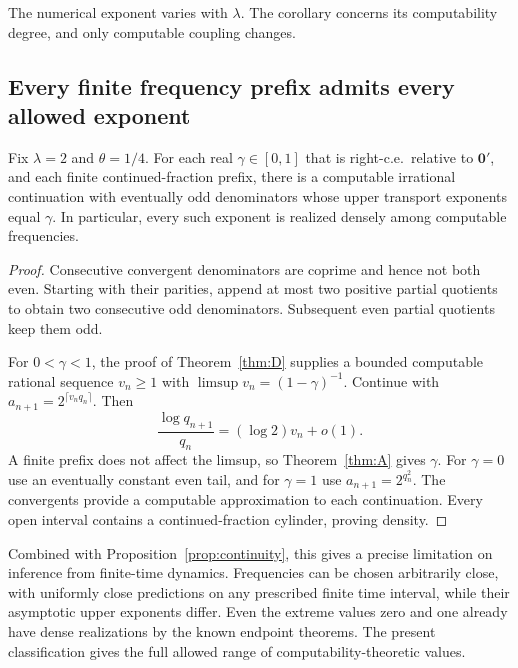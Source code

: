 The numerical exponent varies with $\lambda$. The corollary concerns its computability degree, and only computable coupling changes.

\subsection{Every finite frequency prefix admits every allowed exponent}

\begin{corollary}\label{cor:dense}
Fix $\lambda=2$ and $\theta=1/4$.
For each real $\gamma\in[0,1]$ that is right-c.e.\ relative to $\mathbf0'$, and each finite continued-fraction prefix, there is a computable irrational continuation with eventually odd denominators whose upper transport exponents equal $\gamma$.
In particular, every such exponent is realized densely among computable frequencies.
\end{corollary}
\begin{proof}
Consecutive convergent denominators are coprime and hence not both even.
Starting with their parities, append at most two positive partial quotients to obtain two consecutive odd denominators. Subsequent even partial quotients keep them odd.

For $0<\gamma<1$, the proof of Theorem~\ref{thm:D} supplies a bounded computable rational sequence $v_n\ge1$ with
$\limsup v_n=(1-\gamma)^{-1}$.
Continue with $a_{n+1}=2^{\lceil v_nq_n\rceil}$.
Then
\[
\frac{\log q_{n+1}}{q_n}=(\log2)v_n+o(1).
\]
A finite prefix does not affect the limsup, so Theorem~\ref{thm:A} gives $\gamma$.
For $\gamma=0$ use an eventually constant even tail, and for $\gamma=1$ use
$a_{n+1}=2^{q_n^2}$.
The convergents provide a computable approximation to each continuation.
Every open interval contains a continued-fraction cylinder, proving density.
\end{proof}

Combined with Proposition~\ref{prop:continuity}, this gives a precise limitation on inference from finite-time dynamics. Frequencies can be chosen arbitrarily close, with uniformly close predictions on any prescribed finite time interval, while their asymptotic upper exponents differ. Even the extreme values zero and one already have dense realizations by the known endpoint theorems. The present classification gives the full allowed range of computability-theoretic values.
